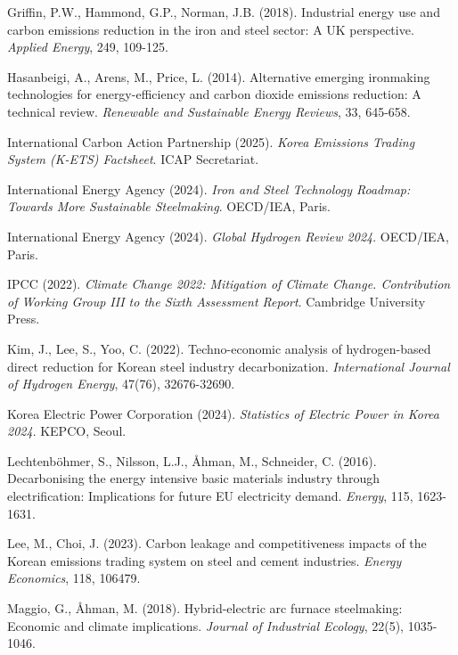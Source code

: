\documentclass[preprint,1p,authoryear]{elsarticle}
\begin{document}
\begin{thebibliography}{99}
 Griffin, P.W., Hammond, G.P., Norman, J.B. (2018). Industrial energy use and carbon emissions reduction in the iron and steel sector: A UK perspective. \textit{Applied Energy}, 249, 109-125.

 Hasanbeigi, A., Arens, M., Price, L. (2014). Alternative emerging ironmaking technologies for energy-efficiency and carbon dioxide emissions reduction: A technical review. \textit{Renewable and Sustainable Energy Reviews}, 33, 645-658.

 International Carbon Action Partnership (2025). \textit{Korea Emissions Trading System (K-ETS) Factsheet}. ICAP Secretariat.

 International Energy Agency (2024). \textit{Iron and Steel Technology Roadmap: Towards More Sustainable Steelmaking}. OECD/IEA, Paris.

 International Energy Agency (2024). \textit{Global Hydrogen Review 2024}. OECD/IEA, Paris.

 IPCC (2022). \textit{Climate Change 2022: Mitigation of Climate Change. Contribution of Working Group III to the Sixth Assessment Report}. Cambridge University Press.

 Kim, J., Lee, S., Yoo, C. (2022). Techno-economic analysis of hydrogen-based direct reduction for Korean steel industry decarbonization. \textit{International Journal of Hydrogen Energy}, 47(76), 32676-32690.

 Korea Electric Power Corporation (2024). \textit{Statistics of Electric Power in Korea 2024}. KEPCO, Seoul.

 Lechtenböhmer, S., Nilsson, L.J., Åhman, M., Schneider, C. (2016). Decarbonising the energy intensive basic materials industry through electrification: Implications for future EU electricity demand. \textit{Energy}, 115, 1623-1631.

 Lee, M., Choi, J. (2023). Carbon leakage and competitiveness impacts of the Korean emissions trading system on steel and cement industries. \textit{Energy Economics}, 118, 106479.

 Maggio, G., Åhman, M. (2018). Hybrid-electric arc furnace steelmaking: Economic and climate implications. \textit{Journal of Industrial Ecology}, 22(5), 1035-1046.


\end{thebibliography}
\end{document}
